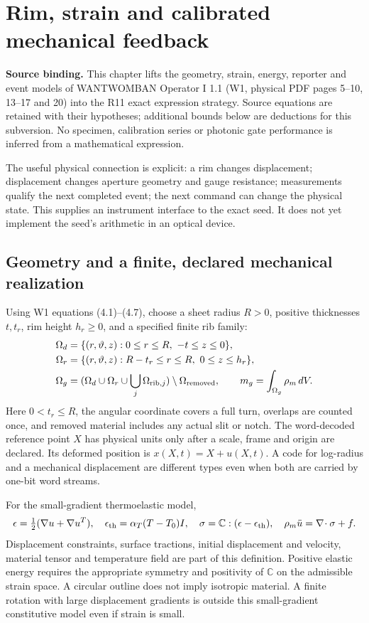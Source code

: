 \section{Rim, strain and calibrated mechanical feedback}
\label{sec:want-physical}
\textbf{Source binding.} This chapter lifts the geometry, strain, energy,
reporter and event models of WANTWOMBAN Operator I 1.1 (W1, physical PDF
pages 5--10, 13--17 and 20) into the R11 exact expression strategy. Source
equations are retained with their hypotheses; additional bounds below are
deductions for this subversion. No specimen, calibration series or photonic
gate performance is inferred from a mathematical expression.

The useful physical connection is explicit: a rim changes displacement;
displacement changes aperture geometry and gauge resistance; measurements
qualify the next completed event; the next command can change the physical
state. This supplies an instrument interface to the exact seed. It does not
yet implement the seed's arithmetic in an optical device.

\subsection{Geometry and a finite, declared mechanical realization}
Using W1 equations (4.1)--(4.7), choose a sheet radius $R>0$, positive
thicknesses $t,t_r$, rim height $h_r\ge0$, and a specified finite rib family:
\begin{align}
 \Omega_d&=\{(r,\vartheta,z):0\le r\le R,\ -t\le z\le0\},\\
 \Omega_r&=\{(r,\vartheta,z):R-t_r\le r\le R,\ 0\le z\le h_r\},\\
 \Omega_g&=(\Omega_d\cup\Omega_r\cup\bigcup_j\Omega_{{\rm rib},j})
                 \setminus\Omega_{\rm removed},\qquad
 m_g=\int_{\Omega_g}\rho_m\,dV .
\end{align}
Here $0<t_r\le R$, the angular coordinate covers a full turn, overlaps are
counted once, and removed material includes any actual slit or notch.
The word-decoded reference point $X$ has physical units only after a scale,
frame and origin are declared. Its deformed position is
$x(X,t)=X+u(X,t)$. A code for log-radius and a mechanical displacement are
different types even when both are carried by one-bit word streams.

For the small-gradient thermoelastic model,
\begin{equation}
 \epsilon=\tfrac12(\nabla u+\nabla u^T),\quad
 \epsilon_{\rm th}=\alpha_T(T-T_0)I,\quad
 \sigma=\mathbb C:(\epsilon-\epsilon_{\rm th}),\quad
 \rho_m\ddot u=\nabla\!\cdot\sigma+f .
\end{equation}
Displacement constraints, surface tractions, initial displacement and velocity,
material tensor and temperature field are part of this definition.
Positive elastic energy requires the appropriate symmetry and positivity of
$\mathbb C$ on the admissible strain space. A circular outline does not imply
isotropic material. A finite rotation with large displacement gradients is
outside this small-gradient constitutive model even if strain is small.

